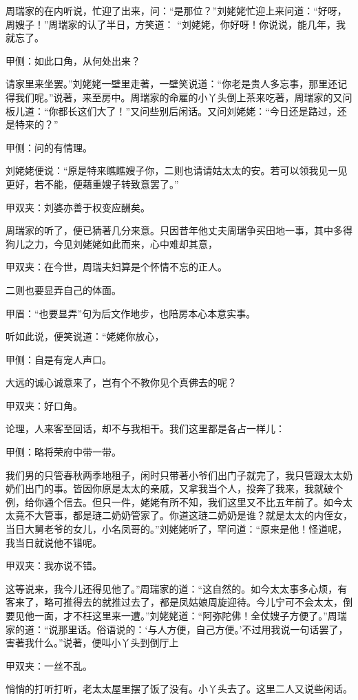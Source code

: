 \begin{parag}
    周瑞家的在内听说，忙迎了出来，问：“是那位？”刘姥姥忙迎上来问道：“好呀，周嫂子！”周瑞家的认了半日，方笑道： “刘姥姥，你好呀！你说说，能几年，我就忘了。\begin{note}甲侧：如此口角，从何处出来？\end{note}请家里来坐罢。”刘姥姥一壁里走著，一壁笑说道：“你老是贵人多忘事，那里还记得我们呢。”说著，来至房中。周瑞家的命雇的小丫头倒上茶来吃著，周瑞家的又问板儿道：“你都长这们大了！”又问些别后闲话。又问刘姥姥：“今日还是路过，还是特来的？”\begin{note}甲侧：问的有情理。\end{note}刘姥姥便说：“原是特来瞧瞧嫂子你，二则也请请姑太太的安。若可以领我见一见更好，若不能，便藉重嫂子转致意罢了。”\begin{note}甲双夹：刘婆亦善于权变应酬矣。\end{note}
\end{parag}


\begin{parag}
    周瑞家的听了，便已猜著几分来意。只因昔年他丈夫周瑞争买田地一事，其中多得狗儿之力，今见刘姥姥如此而来，心中难却其意，\begin{note}甲双夹：在今世，周瑞夫妇算是个怀情不忘的正人。\end{note}二则也要显弄自己的体面。\begin{note}甲眉：“也要显弄”句为后文作地步，也陪房本心本意实事。\end{note}听如此说，便笑说道：“姥姥你放心，\begin{note}甲侧：自是有宠人声口。\end{note}大远的诚心诚意来了，岂有个不教你见个真佛去的呢？\begin{note}甲双夹：好口角。\end{note}论理，人来客至回话，却不与我相干。我们这里都是各占一样儿：\begin{note}甲侧：略将荣府中带一带。\end{note}我们男的只管春秋两季地租子，闲时只带著小爷们出门子就完了，我只管跟太太奶奶们出门的事。皆因你原是太太的亲戚，又拿我当个人，投奔了我来，我就破个例，给你通个信去。但只一件，姥姥有所不知，我们这里又不比五年前了。如今太太竟不大管事，都是琏二奶奶管家了。你道这琏二奶奶是谁？就是太太的内侄女，当日大舅老爷的女儿，小名凤哥的。”刘姥姥听了，罕问道：“原来是他！怪道呢，我当日就说他不错呢。\begin{note}甲双夹：我亦说不错。\end{note}这等说来，我今儿还得见他了。”周瑞家的道：“这自然的。如今太太事多心烦，有客来了，略可推得去的就推过去了，都是凤姑娘周旋迎待。今儿宁可不会太太，倒要见他一面，才不枉这里来一遭。”刘姥姥道：“阿弥陀佛！全仗嫂子方便了。”周瑞家的道：“说那里话。俗语说的：‘与人方便，自己方便。’不过用我说一句话罢了，害著我什么。”说著，便叫小丫头到倒厅上\begin{note}甲双夹：一丝不乱。\end{note}悄悄的打听打听，老太太屋里摆了饭了没有。小丫头去了。这里二人又说些闲话。
\end{parag}


